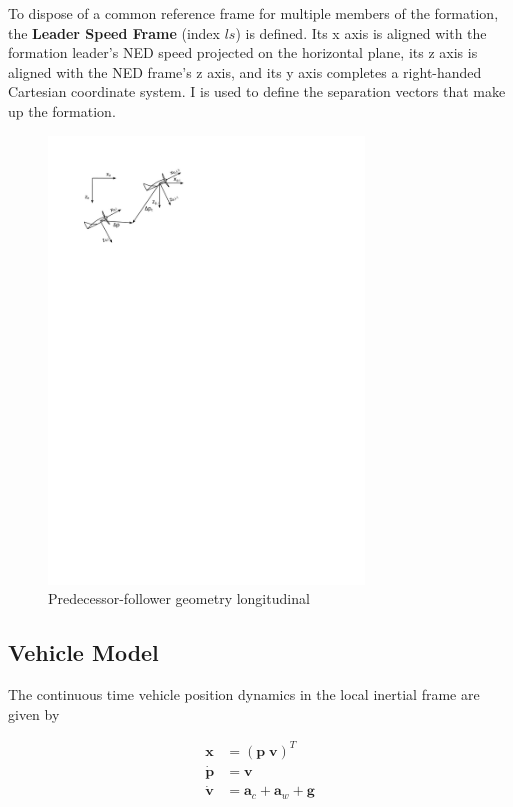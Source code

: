 \documentclass{ifacconf}
\providecommand{\mbf}[1]{\mathbf{#1}}
\begin{document}
To dispose of a common reference frame for multiple members of the formation, the \textbf{Leader Speed Frame} (index $ls$) is defined. Its x axis is aligned with the formation leader's NED speed projected on the horizontal plane, its z axis is aligned with the NED frame's z axis, and its y axis completes a right-handed Cartesian coordinate system. I is used to define the separation vectors that make up the formation.

\begin{figure}
\begin{center}
\includegraphics[width=8.4cm]{frames}    %
\caption{Predecessor-follower geometry longitudinal}
\label{fig:frames}
\end{center}
\end{figure}

\subsection{Vehicle Model}

The continuous time vehicle position dynamics in the local inertial frame are given by

\begin{align}
\mathbf{x} &= (\mbf{p} \; \mbf{v})^T \\
\dot{\mathbf{p}} &= \mbf{v}\\
\dot{\mbf{v}} &= \mbf{a}_{c} + \mbf{a}_w + \mbf{g}\\
\end{align}
\end{document}
